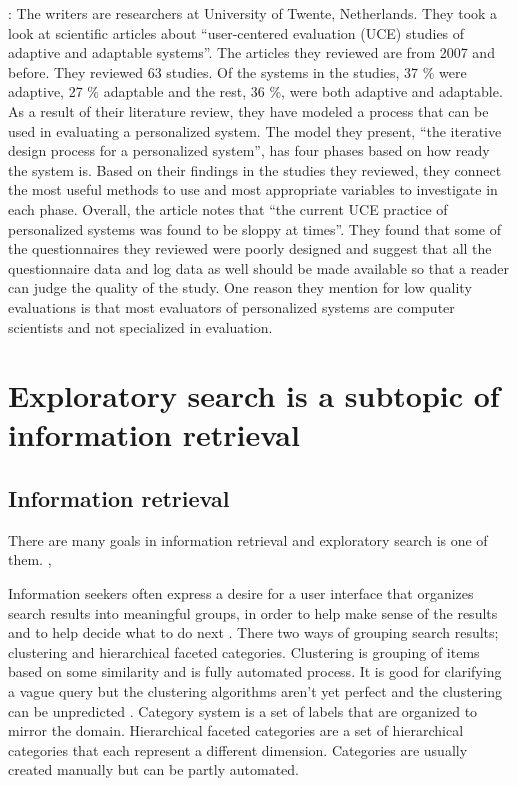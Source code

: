 \documentclass{sigchi}
\begin{document}
\cite{van08}: The writers are researchers at University of Twente, Netherlands. They took a look at scientific articles about “user-centered evaluation (UCE) studies of adaptive and adaptable systems”. The articles they reviewed are from 2007 and before. They reviewed 63 studies. Of the systems in the studies, 37 \% were adaptive, 27 \% adaptable and the rest, 36 \%, were both adaptive and adaptable. As a result of their literature review, they have modeled a process that can be used in evaluating a personalized system.
The model they present, “the iterative design process for a personalized system”, has four phases based on how ready the system is. Based on their findings in the studies they reviewed, they connect the most useful methods to use and most appropriate variables to investigate in each phase.
Overall, the article notes that “the current UCE practice of personalized systems was found to be sloppy at times”. They found that some of the questionnaires they reviewed were poorly designed and suggest that all the questionnaire data and log data as well should be made available so that a reader can judge the quality of the study. One reason they mention for low quality evaluations is that most evaluators of personalized systems are computer scientists and not specialized in evaluation.

\section {Exploratory search is a subtopic of information retrieval}

\subsection{Information retrieval}
There are many goals in information retrieval and exploratory search is one of them.
\cite{hearst02}, \cite{kuhlt91}

Information seekers often express a desire for a user interface that organizes search results into meaningful groups, in order to help make sense of the results and to help decide what to do next \cite{hearst06}. There two ways of grouping search results; clustering and hierarchical faceted categories. Clustering is grouping of items based on some similarity and is fully automated process. It is good for clarifying a vague query but the clustering algorithms aren't yet perfect and the clustering can be unpredicted \cite{hearst06}. Category system is a set of labels that are organized to mirror the domain. Hierarchical faceted categories are a set of hierarchical categories that each represent a different dimension. Categories are usually created manually but can be partly automated. 
\end{document}
